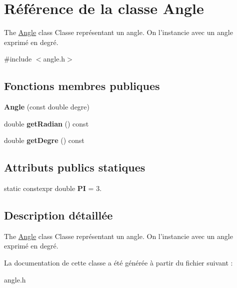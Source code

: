 \hypertarget{class_angle}{\section{Référence de la classe Angle}
\label{class_angle}
}


The \hyperlink{class_angle}{Angle} class Classe représentant un angle. On l'instancie avec un angle exprimé en degré.  




{\ttfamily \#include $<$angle.\+h$>$}

\subsection*{Fonctions membres publiques}
\begin{DoxyCompactItemize}
\item 
\hypertarget{class_angle_a82d90a585c6e52fbe5514e6c1b327cbe}{{\bfseries Angle} (const double degre)}\label{class_angle_a82d90a585c6e52fbe5514e6c1b327cbe}

\item 
\hypertarget{class_angle_ae22d147ca274e7958800df1a21291021}{double {\bfseries get\+Radian} () const }\label{class_angle_ae22d147ca274e7958800df1a21291021}

\item 
\hypertarget{class_angle_ad10cc86bfb48bb9ebbc4c758552e51b1}{double {\bfseries get\+Degre} () const }\label{class_angle_ad10cc86bfb48bb9ebbc4c758552e51b1}

\end{DoxyCompactItemize}
\subsection*{Attributs publics statiques}
\begin{DoxyCompactItemize}
\item 
\hypertarget{class_angle_adb021f735de596a5d1a665d1a14ff7b9}{static constexpr double {\bfseries P\+I} = 3.}\label{class_angle_adb021f735de596a5d1a665d1a14ff7b9}

\end{DoxyCompactItemize}


\subsection{Description détaillée}
The \hyperlink{class_angle}{Angle} class Classe représentant un angle. On l'instancie avec un angle exprimé en degré. 

La documentation de cette classe a été générée à partir du fichier suivant \+:\begin{DoxyCompactItemize}
\item 
angle.\+h\end{DoxyCompactItemize}
